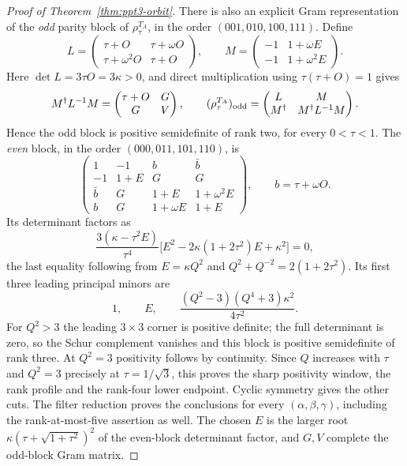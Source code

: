 \begin{proof}[Proof of Theorem~\ref{thm:ppt3-orbit}]
There is also an explicit Gram representation of the
\emph{odd} parity block of $\rho_\tau^{T_A}$, in the order
$(001,010,100,111)$. Define
\[
L=\begin{pmatrix}\tau+O&\tau+\omega O\\
\tau+\omega^2O&\tau+O\end{pmatrix},
\qquad
M=\begin{pmatrix}-1&1+\omega E\\
                 -1&1+\omega^2E\end{pmatrix}.
\]
Here $\det L=3\tau O=3\kappa>0$, and direct multiplication
using $\tau(\tau+O)=1$ gives
\[
M^\dagger L^{-1}M=
\begin{pmatrix}\tau+O&G\\G&V\end{pmatrix},
\qquad
(\rho_\tau^{T_A})_{\rm odd}=
\begin{pmatrix}L&M\\M^\dagger&M^\dagger L^{-1}M\end{pmatrix}.
\]
Hence the odd block is positive semidefinite of rank two,
for every $0<\tau<1$. The \emph{even} block, in the order
$(000,011,101,110)$, is
\[
\begin{pmatrix}
1&-1&b&\bar b\\
-1&1+E&G&G\\
\bar b&G&1+E&1+\omega^2E\\
b&G&1+\omega E&1+E
\end{pmatrix},\qquad b=\tau+\omega O.
\]
Its determinant factors as
\[
\frac{3(\kappa-\tau^2E)}{\tau^4}
 \bigl[E^2-2\kappa(1+2\tau^2)E+\kappa^2\bigr]=0,
\]
the last equality following from $E=\kappa Q^2$ and
$Q^2+Q^{-2}=2(1+2\tau^2)$.
Its first three leading principal minors are
\begin{equation}\label{eq:ppt3-surface-minors}
1,\qquad E,\qquad
\frac{(Q^2-3)(Q^4+3)\kappa^2}{4\tau^2}.
\end{equation}
For $Q^2>3$ the leading $3\times3$ corner is positive
definite; the full determinant is zero, so the Schur
complement vanishes and this block is positive semidefinite
of rank three. At $Q^2=3$ positivity follows by
continuity. Since $Q$ increases with $\tau$ and
$Q^2=3$ precisely at $\tau=1/\sqrt3$, this proves the
sharp positivity window, the rank profile and the
rank-four lower endpoint. Cyclic symmetry gives the
other cuts. The filter reduction proves the conclusions
for every $(\alpha,\beta,\gamma)$, including the rank-at-most-five
assertion as well. The chosen $E$ is the larger root
$\kappa(\tau+\sqrt{1+\tau^2})^2$ of the even-block determinant
factor, and $G,V$ complete the odd-block Gram matrix.


\end{proof}
